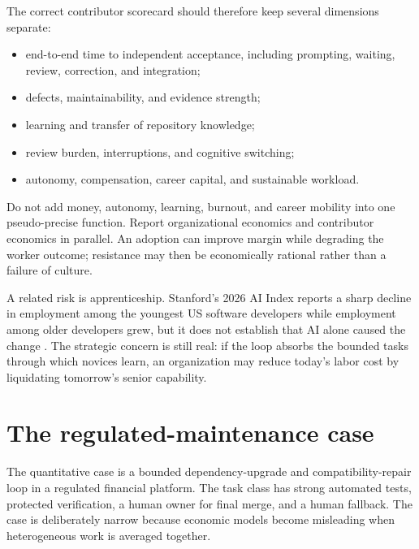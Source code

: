 \documentclass[11pt]{article}
\begin{document}
The correct contributor scorecard should therefore keep several dimensions separate:

\begin{itemize}
\item end-to-end time to independent acceptance, including prompting, waiting, review, correction, and integration;
\item defects, maintainability, and evidence strength;
\item learning and transfer of repository knowledge;
\item review burden, interruptions, and cognitive switching;
\item autonomy, compensation, career capital, and sustainable workload.
\end{itemize}

Do not add money, autonomy, learning, burnout, and career mobility into one pseudo-precise function. Report organizational economics and contributor economics in parallel. An adoption can improve margin while degrading the worker outcome; resistance may then be economically rational rather than a failure of culture.

A related risk is apprenticeship. Stanford's 2026 AI Index reports a sharp decline in employment among the youngest US software developers while employment among older developers grew, but it does not establish that AI alone caused the change \cite{stanford2026}. The strategic concern is still real: if the loop absorbs the bounded tasks through which novices learn, an organization may reduce today's labor cost by liquidating tomorrow's senior capability.

\section{The regulated-maintenance case}

The quantitative case is a bounded dependency-upgrade and compatibility-repair loop in a regulated financial platform. The task class has strong automated tests, protected verification, a human owner for final merge, and a human fallback. The case is deliberately narrow because economic models become misleading when heterogeneous work is averaged together.
\end{document}
